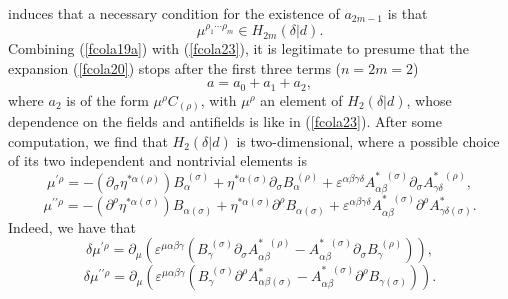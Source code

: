 \documentclass[a4paper,12pt]{article}
\begin{document}
induces that a necessary condition for the existence of $a_{2m-1}$ is that 
\begin{equation}
\mu ^{\rho _{1}\cdots \rho _{m}}\in H_{2m}\left( \delta |d\right) .
\label{fcola24}
\end{equation}
Combining (\ref{fcola19a}) with (\ref{fcola23}), it is legitimate to presume
that the expansion (\ref{fcola20}) stops after the first three terms ($%
n=2m=2 $) 
\begin{equation}
a=a_{0}+a_{1}+a_{2},  \label{fcola25}
\end{equation}
where $a_{2}$ is of the form $\mu ^{\rho }C_{(\rho )}$, with $\mu ^{\rho }$
an element of $H_{2}\left( \delta |d\right) $, whose dependence on the
fields and antifields is like in (\ref{fcola23}). After some computation, we
find that $H_{2}\left( \delta |d\right) $ is two-dimensional, where a
possible choice of its two independent and nontrivial elements is 
\begin{equation}
\mu ^{\prime \rho }=-\left( \partial _{\sigma }\eta ^{*\alpha (\rho
)}\right) B_{\alpha }^{\;(\sigma )}+\eta ^{*\alpha (\sigma )}\partial
_{\sigma }B_{\alpha }^{\;(\rho )}+\varepsilon ^{\alpha \beta \gamma \delta
}A_{\alpha \beta }^{*\;\;(\sigma )}\partial _{\sigma }A_{\gamma \delta
}^{*\;\;(\rho )},  \label{fcola26}
\end{equation}
\begin{equation}
\mu ^{\prime \prime \rho }=-\left( \partial ^{\rho }\eta ^{*\alpha (\sigma
)}\right) B_{\alpha (\sigma )}+\eta ^{*\alpha (\sigma )}\partial ^{\rho
}B_{\alpha (\sigma )}+\varepsilon ^{\alpha \beta \gamma \delta }A_{\alpha
\beta }^{*\;\;(\sigma )}\partial ^{\rho }A_{\gamma \delta (\sigma )}^{*}.
\label{fcola27}
\end{equation}
Indeed, we have that 
\begin{equation}
\delta \mu ^{\prime \rho }=\partial _{\mu }\left( \varepsilon ^{\mu \alpha
\beta \gamma }\left( B_{\gamma }^{\;(\sigma )}\partial _{\sigma }A_{\alpha
\beta }^{*\;\;(\rho )}-A_{\alpha \beta }^{*\;\;(\sigma )}\partial _{\sigma
}B_{\gamma }^{\;(\rho )}\right) \right) ,  \label{fcola26a}
\end{equation}
\begin{equation}
\delta \mu ^{\prime \prime \rho }=\partial _{\mu }\left( \varepsilon ^{\mu
\alpha \beta \gamma }\left( B_{\gamma }^{\;(\sigma )}\partial ^{\rho
}A_{\alpha \beta (\sigma )}^{*}-A_{\alpha \beta }^{*\;\;(\sigma )}\partial
^{\rho }B_{\gamma (\sigma )}\right) \right) .  \label{fcola27a}
\end{equation}
\end{document}
